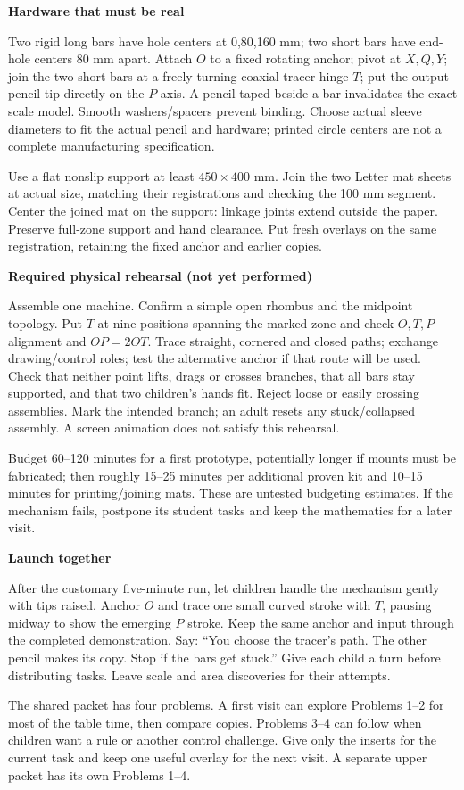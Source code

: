 \documentclass[11pt,letterpaper]{article}
\newcommand{\heading}[1]{\par\vspace{4pt}{\large\bfseries #1}\par}
\newcommand{\sub}[1]{\par\textbf{#1}\par}
\begin{document}
\sub{Hardware that must be real}
Two rigid long bars have hole centers at 0,80,160 mm; two short bars have end-hole centers 80 mm apart. Attach $O$ to a fixed rotating anchor; pivot at $X,Q,Y$; join the two short bars at a freely turning coaxial tracer hinge $T$; put the output pencil tip directly on the $P$ axis. A pencil taped beside a bar invalidates the exact scale model. Smooth washers/spacers prevent binding. Choose actual sleeve diameters to fit the actual pencil and hardware; printed circle centers are not a complete manufacturing specification.

Use a flat nonslip support at least $450\times400$ mm. Join the two Letter mat sheets at actual size, matching their registrations and checking the 100 mm segment. Center the joined mat on the support: linkage joints extend outside the paper. Preserve full-zone support and hand clearance. Put fresh overlays on the same registration, retaining the fixed anchor and earlier copies.

\sub{Required physical rehearsal (not yet performed)}
Assemble one machine. Confirm a simple open rhombus and the midpoint topology. Put $T$ at nine positions spanning the marked zone and check $O,T,P$ alignment and $OP=2OT$. Trace straight, cornered and closed paths; exchange drawing/control roles; test the alternative anchor if that route will be used. Check that neither point lifts, drags or crosses branches, that all bars stay supported, and that two children's hands fit. Reject loose or easily crossing assemblies. Mark the intended branch; an adult resets any stuck/collapsed assembly. A screen animation does not satisfy this rehearsal.

Budget 60--120 minutes for a first prototype, potentially longer if mounts must be fabricated; then roughly 15--25 minutes per additional proven kit and 10--15 minutes for printing/joining mats. These are untested budgeting estimates. If the mechanism fails, postpone its student tasks and keep the mathematics for a later visit.

\sub{Launch together}
After the customary five-minute run, let children handle the mechanism gently with tips raised. Anchor $O$ and trace one small curved stroke with $T$, pausing midway to show the emerging $P$ stroke. Keep the same anchor and input through the completed demonstration. Say: ``You choose the tracer's path. The other pencil makes its copy. Stop if the bars get stuck.'' Give each child a turn before distributing tasks. Leave scale and area discoveries for their attempts.
\newpage
\heading{Shared packet: copying and control}
The shared packet has four problems. A first visit can explore Problems 1--2 for most of the table time, then compare copies. Problems 3--4 can follow when children want a rule or another control challenge. Give only the inserts for the current task and keep one useful overlay for the next visit. A separate upper packet has its own Problems 1--4.
\end{document}
